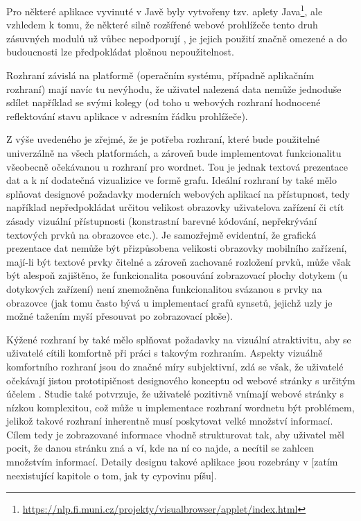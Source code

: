 \documentclass[a4paper, 11pt, oneside]{book}
\begin{document}
			Pro některé aplikace vyvinuté v Javě byly vytvořeny tzv. aplety Java\footnote{\url{https://nlp.fi.muni.cz/projekty/visualbrowser/applet/index.html}}, ale vzhledem k tomu, že některé silně rozšířené webové prohlížeče tento druh zásuvných modulů už vůbec nepodporují \parencite{MozzilaFoundation2017}, je jejich použití značně omezené a do budoucnosti lze předpokládat plošnou nepoužitelnost. 

			Rozhraní závislá na platformě (operačním systému, případně aplikačním rozhraní) mají navíc tu nevýhodu, že uživatel nalezená data nemůže jednoduše sdílet například se svými kolegy (od toho u webových rozhraní hodnocené reflektování stavu aplikace v adresním řádku prohlížeče). 

			Z výše uvedeného je zřejmé, že je potřeba rozhraní, které bude použitelné univerzálně na všech platformách, a zároveň bude implementovat funkcionalitu všeobecně očekávanou u rozhraní pro wordnet. Tou je jednak textová prezentace dat a k ní dodatečná vizualizice ve formě grafu. Ideální rozhraní by také mělo splňovat designové požadavky moderních webových aplikací na přístupnost, tedy například nepředpokládat určitou velikost obrazovky uživatelova zařízení či ctít zásady vizuální přístupnosti (konstrastní barevné kódování, nepřekrývání textových prvků na obrazovce etc.). Je samozřejmě evidentní, že grafická prezentace dat nemůže být přizpůsobena velikosti obrazovky mobilního zařízení, mají-li být textové prvky čitelné a zároveň zachované rozložení prvků, může však být alespoň zajištěno, že funkcionalita posouvání zobrazovací plochy dotykem (u dotykových zařízení) není znemožněna funkcionalitou svázanou s prvky na obrazovce (jak tomu často bývá u implementací grafů synsetů, jejichž uzly je možné tažením myší přesouvat po zobrazovací ploše). 

			Kýžené rozhraní by také mělo splňovat požadavky na vizuální atraktivitu, aby se uživatelé cítili komfortně při práci s takovým rozhraním. Aspekty vizuálně komfortního rozhraní jsou do značné míry subjektivní, zdá se však, že uživatelé očekávají jistou prototipičnost designového konceptu od webové stránky s určitým účelem \parencite{walker2013simple, tuch2012role}. Studie \parencite{tuch2012role} také potvrzuje, že uživatelé pozitivně vnímají webové stránky s nízkou komplexitou, což může u implementace rozhraní wordnetu být problémem, jelikož takové rozhraní inherentně musí poskytovat velké množství informací. Cílem tedy je zobrazované informace vhodně strukturovat tak, aby uživatel měl pocit, že danou stránku zná a ví, kde na ní co najde, a necítil se zahlcen množstvím informací. Detaily designu takové aplikace jsou rozebrány v [zatím neexistující kapitole o tom, jak ty cypovinu píšu]. 
\end{document}
